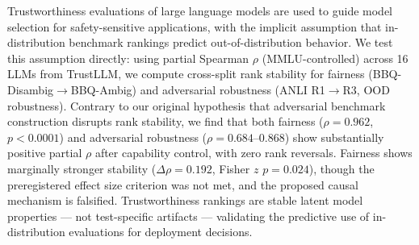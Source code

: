 Trustworthiness evaluations of large language models are used to guide model selection for safety-sensitive applications, with the implicit assumption that in-distribution benchmark rankings predict out-of-distribution behavior. We test this assumption directly: using partial Spearman $\rho$ (MMLU-controlled) across 16 LLMs from TrustLLM, we compute cross-split rank stability for fairness (BBQ-Disambig$\rightarrow$BBQ-Ambig) and adversarial robustness (ANLI R1$\rightarrow$R3, OOD robustness). Contrary to our original hypothesis that adversarial benchmark construction disrupts rank stability, we find that both fairness ($\rho = 0.962$, $p < 0.0001$) and adversarial robustness ($\rho = 0.684$--$0.868$) show substantially positive partial $\rho$ after capability control, with zero rank reversals. Fairness shows marginally stronger stability ($\Delta\rho = 0.192$, Fisher $z$ $p = 0.024$), though the preregistered effect size criterion was not met, and the proposed causal mechanism is falsified. Trustworthiness rankings are stable latent model properties --- not test-specific artifacts --- validating the predictive use of in-distribution evaluations for deployment decisions.

